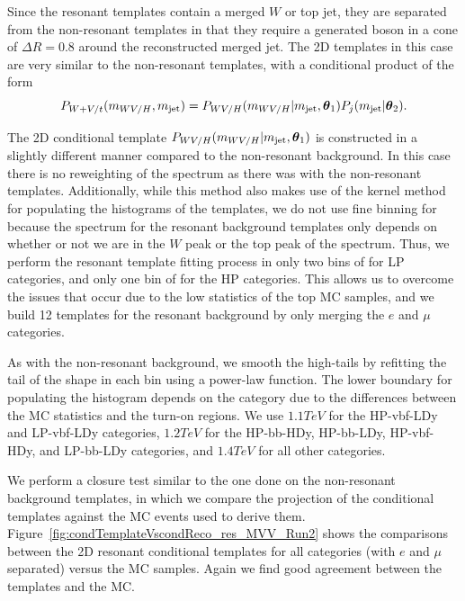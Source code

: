 Since the resonant templates contain a merged $W$ or top jet, they are separated from the non-resonant templates in that they require a generated boson in a cone of $\Delta R=0.8$ around the reconstructed merged jet.
The 2D templates in this case are very similar to the non-resonant templates, with a conditional product of the form
\begin{equation}
  P_{W+V/t}(m_{WV/H},m_\mathrm{jet})=P_{WV/H}(m_{WV/H}|m_\mathrm{jet},\vb*{\theta}_1)P_j(m_\mathrm{jet}|\vb*{\theta}_2).
\end{equation}

The 2D conditional template $P_{WV/H}(m_{WV/H}|m_\mathrm{jet},\vb*{\theta}_1)$ is constructed in a slightly different manner compared to the non-resonant background.
In this case there is no reweighting of the \MVV spectrum as there was with the non-resonant templates.
Additionally, while this method also makes use of the kernel method for populating the histograms of the templates, we do not use fine binning for \MJ because the \MVV spectrum for the resonant background templates only depends on whether or not we are in the $W$ peak or the top peak of the \MJ spectrum.
Thus, we perform the resonant template fitting process in only two bins of \MJ for LP categories, and only one bin of \MJ for the HP categories.
This allows us to overcome the issues that occur due to the low statistics of the top MC samples, and we build 12 templates for the resonant background by only merging the $e$ and $\mu$ categories.

As with the non-resonant background, we smooth the high-\MVV tails by refitting the tail of the \MVV shape in each \MJ bin using a power-law function.
The lower boundary for populating the histogram depends on the category due to the differences between the MC statistics and the turn-on regions.
We use $1.1\unit{TeV}$ for the HP-vbf-LDy and LP-vbf-LDy categories, $1.2\unit{TeV}$ for the HP-bb-HDy, HP-bb-LDy, HP-vbf-HDy, and LP-bb-LDy categories, and $1.4\unit{TeV}$ for all other categories.

We perform a closure test similar to the one done on the non-resonant background templates, in which we compare the \MVV projection of the conditional templates against the MC events used to derive them.
Figure~\ref{fig:condTemplateVscondReco_res_MVV_Run2} shows the comparisons between the 2D resonant conditional templates for all categories (with $e$ and $\mu$ separated) versus the MC samples.
Again we find good agreement between the templates and the MC.

